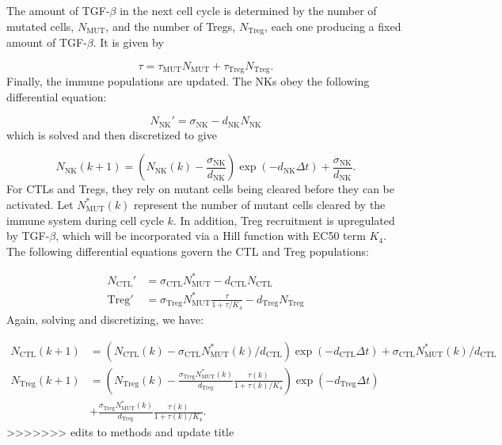 \documentclass[11pt]{article}
\begin{document}
The amount of TGF-$\beta$ in the next cell cycle is determined by the number of mutated cells, $N_{\text{MUT}}$, and the number of Tregs, $N_{\text{Treg}}$, each one producing a fixed amount of TGF-$\beta$. It is given by

\begin{equation}\tag{2.6}
\tau = \tau_{\text{MUT}}N_{\text{MUT}} + \tau_{\text{Treg}}N_{\text{Treg}}.
\end{equation}
Finally, the immune populations are updated.
The NKs obey the following differential equation:
 
\begin{equation}\tag{2.7}
N_{\text{NK}}' = \sigma_{\text{NK}} - d_{\text{NK}}N_{\text{NK}}
\end{equation}
which is solved and then discretized to give
 
 \begin{equation}\tag{2.8}
N_{\text{NK}}(k+1) = \left (N_{\text{NK}}(k)-\frac{\sigma_{\text{NK}}}{d_{\text{NK}}} \right )\exp(-d_{\text{NK}}\Delta t)+\frac{\sigma_{\text{NK}}}{d_{\text{NK}}}.
\end{equation}
For CTLs and Tregs, they rely on mutant cells being cleared before they can be activated.
Let $N_{\text{MUT}}^*(k)$ represent the number of mutant cells cleared by the immune system during cell cycle $k$.
In addition, Treg recruitment is upregulated by TGF-$\beta$, which will be incorporated via a Hill function with EC50 term $K_4$.
The following differential equations govern the CTL and Treg populations:

\begin{equation}\tag{2.9}
\begin{split}
N_\text{CTL}' & = \sigma_{\text{CTL}}N_{\text{MUT}}^* - d_{\text{CTL}}N_\text{CTL} \\
\text{Treg}' & = \sigma_{\text{Treg}}N_{\text{MUT}}^* \frac{\tau}{1+\tau/K_4}- d_{\text{Treg}}N_\text{Treg}
\end{split}
\end{equation}
Again, solving and discretizing, we have:

\begin{equation}\tag{2.10}
\begin{split}
N_\text{CTL}(k+1) & =  \left (N_\text{CTL}(k)-\sigma_{\text{CTL}}N_{\text{MUT}}^*(k)/d_{\text{CTL}}\right )\exp(- d_{\text{CTL}}\Delta t) + \sigma_{\text{CTL}}N_{\text{MUT}}^*(k)/d_{\text{CTL}}\\
N_\text{Treg}(k+1) & =  \left (N_\text{Treg}(k)-\frac{\sigma_{\text{Treg}}N_{\text{MUT}}^*(k)}{d_{\text{Treg}}} \frac{\tau(k)}{1+\tau(k)/K_4}\right )\exp(-d_{\text{Treg}}\Delta t)\\
&+ \frac{\sigma_{\text{Treg}}N_{\text{MUT}}^*(k)}{d_{\text{Treg}}} \frac{\tau(k)}{1+\tau(k)/K_4}.
\end{split}
\end{equation}
>>>>>>> edits to methods and update title
\end{document}
